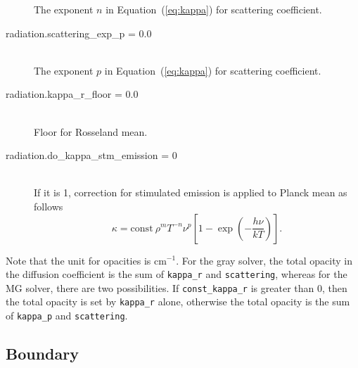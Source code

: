 \documentclass[11pt,letterpaper]{article}
\begin{document}
\begin{description}
  The exponent $n$ in Equation~(\ref{eq:kappa}) for scattering coefficient.
\item[radiation.scattering\_exp\_p = 0.0] \hfill \\
  The exponent $p$ in Equation~(\ref{eq:kappa}) for scattering coefficient.
\item[radiation.kappa\_r\_floor = 0.0] \hfill \\
  Floor for Rosseland mean.
\item[radiation.do\_kappa\_stm\_emission = 0] \hfill \\
  If it is 1, correction for stimulated emission is applied to Planck mean as
  follows
  \begin{equation}
    \kappa = \mathrm{const}\ \rho^{m} T^{-n} \nu^{p}
    [1-\exp{(-\frac{h\nu}{k T})}].
  \end{equation}
\end{description}

\noindent Note that the unit for opacities is $\mathrm{cm}^{-1}$.  For
the gray solver, the total opacity in the diffusion coefficient is the sum
of {\tt kappa\_r} and {\tt scattering}, whereas for the MG solver,
there are two possibilities.  If {\tt const\_kappa\_r} is greater than
0, then the total opacity is set by {\tt kappa\_r} alone, otherwise
the total opacity is the sum of {\tt kappa\_p} and {\tt scattering}. 

\subsection{Boundary}
\end{document}
